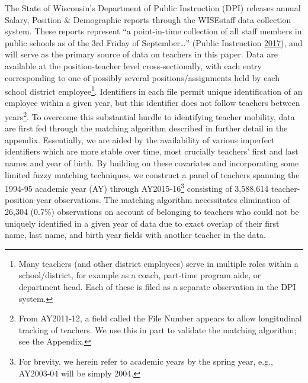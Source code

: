 \documentclass[12pt,]{article}
\let\rmarkdownfootnote\footnote%
\def\footnote{\protect\rmarkdownfootnote}
\begin{document}
The State of Wisconsin's Department of Public Instruction (DPI) releases
annual Salary, Position \& Demographic reports through the WISEstaff
data collection system. These reports represent ``a point-in-time
collection of all staff members in public schools as of the 3rd Friday
of September\ldots{}'' (Public Instruction
\protect\hyperlink{ref-dpi}{2017}), and will serve as the primary source
of data on teachers in this paper. Data are available at the
position-teacher level cross-sectionally, with each entry corresponding
to one of possibly several positions/assignments held by each school
district employee\footnote{Many teachers (and other district employees)
  serve in multiple roles within a school/district, for example as a
  coach, part-time program aide, or department head. Each of these is
  filed as a separate observation in the DPI system.}. Identifiers in
each file permit unique identification of an employee within a given
year, but this identifier does not follow teachers between
years\footnote{From AY2011-12, a field called the File Number appears to
  allow longitudinal tracking of teachers. We use this in part to
  validate the matching algorithm; see the Appendix.}. To overcome this
substantial hurdle to identifying teacher mobility, data are first fed
through the matching algorithm described in further detail in the
appendix. Essentially, we are aided by the availability of various
imperfect identifiers which are more stable over time, most crucially
teachers' first and last names and year of birth. By building on these
covariates and incorporating some limited fuzzy matching techniques, we
construct a panel of teachers spanning the 1994-95 academic year (AY)
through AY2015-16\footnote{For brevity, we herein refer to academic
  years by the spring year, e.g., AY2003-04 will be simply 2004.}
consisting of 3,588,614 teacher-position-year observations. The matching
algorithm necessitates elimination of 26,304 (0.7\%) observations on
account of belonging to teachers who could not be uniquely identified in
a given year of data due to exact overlap of their first name, last
name, and birth year fields with another teacher in the data.
\end{document}

